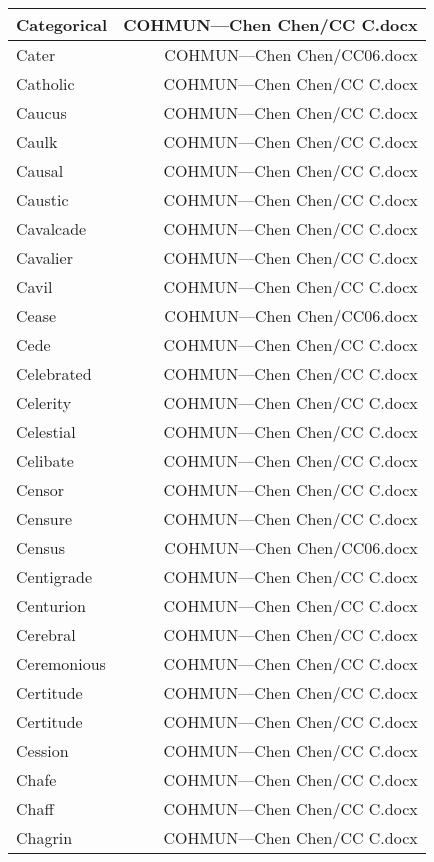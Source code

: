 \documentclass{article}
\begin{document}
\begin{center}
\begin{longtable}{|l|r|}
\hline
Categorical  &  COHMUN---Chen Chen/CC C.docx\\  
\hline
Cater  &  COHMUN---Chen Chen/CC06.docx\\  
\hline
Catholic  &  COHMUN---Chen Chen/CC C.docx\\  
\hline
Caucus  &  COHMUN---Chen Chen/CC C.docx\\  
\hline
Caulk  &  COHMUN---Chen Chen/CC C.docx\\  
\hline
Causal  &  COHMUN---Chen Chen/CC C.docx\\  
\hline
Caustic  &  COHMUN---Chen Chen/CC C.docx\\  
\hline
Cavalcade  &  COHMUN---Chen Chen/CC C.docx\\  
\hline
Cavalier  &  COHMUN---Chen Chen/CC C.docx\\  
\hline
Cavil  &  COHMUN---Chen Chen/CC C.docx\\  
\hline
Cease  &  COHMUN---Chen Chen/CC06.docx\\  
\hline
Cede  &  COHMUN---Chen Chen/CC C.docx\\  
\hline
Celebrated  &  COHMUN---Chen Chen/CC C.docx\\  
\hline
Celerity  &  COHMUN---Chen Chen/CC C.docx\\  
\hline
Celestial  &  COHMUN---Chen Chen/CC C.docx\\  
\hline
Celibate  &  COHMUN---Chen Chen/CC C.docx\\  
\hline
Censor  &  COHMUN---Chen Chen/CC C.docx\\  
\hline
Censure  &  COHMUN---Chen Chen/CC C.docx\\  
\hline
Census  &  COHMUN---Chen Chen/CC06.docx\\  
\hline
Centigrade  &  COHMUN---Chen Chen/CC C.docx\\  
\hline
Centurion  &  COHMUN---Chen Chen/CC C.docx\\  
\hline
Cerebral  &  COHMUN---Chen Chen/CC C.docx\\  
\hline
Ceremonious  &  COHMUN---Chen Chen/CC C.docx\\  
\hline
Certitude  &  COHMUN---Chen Chen/CC C.docx\\  
\hline
Certitude  &  COHMUN---Chen Chen/CC C.docx\\  
\hline
Cession  &  COHMUN---Chen Chen/CC C.docx\\  
\hline
Chafe  &  COHMUN---Chen Chen/CC C.docx\\  
\hline
Chaff  &  COHMUN---Chen Chen/CC C.docx\\  
\hline
Chagrin  &  COHMUN---Chen Chen/CC C.docx\\  

\end{longtable}
\end{center}
\end{document}
